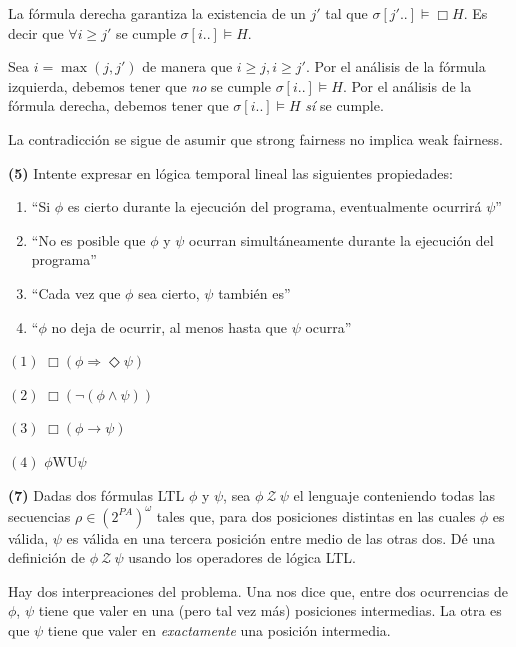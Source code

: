 \documentclass[a4paper, 12pt]{article}
\begin{document}
La fórmula derecha garantiza la existencia de un $j'$ tal que $\sigma[j'..]
\vDash \Box H$. Es decir que $\forall i \geq j'$ se cumple $\sigma[i..] \vDash
H$.

Sea $i = \max(j, j')$ de manera que $i \geq j, i \geq j'$. Por el análisis de la
fórmula izquierda, debemos tener que \textit{no} se cumple $\sigma[i..] \vDash
H$. Por el análisis de la fórmula derecha, debemos tener que $\sigma[i..] \vDash
H$ \textit{sí} se cumple.

La contradicción se sigue de asumir que strong fairness no implica weak
fairness.

\pagebreak 

\begin{myframe}
    \textbf{(5)} Intente expresar en lógica temporal lineal las siguientes propiedades:

\begin{enumerate}
    \item “Si $\phi$ es cierto durante la ejecución del programa, eventualmente ocurrirá $\psi$”
    \item “No es posible que $\phi$ y $\psi$ ocurran simultáneamente durante la ejecución del programa”
    \item “Cada vez que $\phi$ sea cierto, $\psi$ también es”
    \item “$\phi$ no deja de ocurrir, al menos hasta que $\psi$ ocurra”
\end{enumerate}
\end{myframe}

$(1)$ $\Box (\phi \Rightarrow \Diamond  \psi)$


$(2)$ $\Box \left( \neg \left( \phi \land \psi \right)  \right) $

$(3)$ $\Box (\phi\to  \psi)$

$(4)$ $\phi \text{WU} \psi$

\pagebreak

\begin{myframe}
    
\textbf{(7)} Dadas dos fórmulas LTL $\phi$ y $\psi$, sea $\phi \ \mathcal{Z} \ \psi$ el lenguaje conteniendo todas las secuencias $\rho \in (2^{PA})^\omega$ tales que, para dos posiciones distintas en las cuales $\phi$ es válida, $\psi$ es válida en una tercera posición entre medio de las otras dos. Dé una definición de $\phi \ \mathcal{Z} \ \psi$ usando los operadores de lógica LTL.

\end{myframe}

Hay dos interpreaciones del problema. Una nos dice que, entre dos ocurrencias de
$\phi$, $\psi$ tiene que valer en una (pero tal vez más) posiciones intermedias.
La otra es que $\psi$ tiene que valer en \textit{exactamente} una posición
intermedia.
\end{document}
